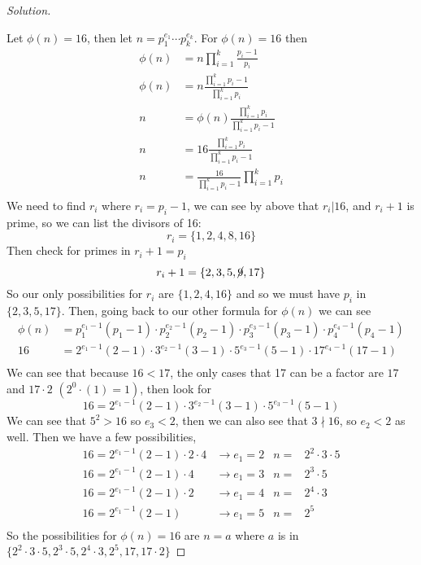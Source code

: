 \documentclass[11pt]{article}
\newcommand{\ndiv}{\nmid}
\newenvironment{solution}
  {\renewcommand\qedsymbol{$~$}\begin{proof}[Solution]$ $\par\nobreak\ignorespaces}
  {\end{proof}}
\begin{document}
\begin{solution}
    Let $\phi(n)=16$, then let $n=p_1^{e_1}\cdots p_k^{e_k}$. For $\phi(n)=16$ then
    \begin{align*}
        \phi(n) & = n \prod^{k}_{i=1} \frac{p_i-1}{p_i}                       \\
        \phi(n) & = n  \frac{\prod^{k}_{i=1} p_i-1}{\prod^{k}_{i=1} p_i}      \\
        n       & = \phi(n) \frac{\prod^{k}_{i=1} p_i}{\prod^{k}_{i=1} p_i-1} \\
        n       & = 16 \frac{\prod^{k}_{i=1} p_i}{\prod^{k}_{i=1} p_i-1}      \\
        n       & = \frac{16}{\prod^{k}_{i=1} p_i-1}  \prod^{k}_{i=1} p_i     \\
    \end{align*}
    We need to find $r_i$ where $r_i=p_i-1$, we can see by above that $r_i|16$, and $r_i+1$ is prime, so we can list the divisors of 16:
    \[
        r_i = \{1, 2, 4, 8, 16\}
    \]
    Then check for primes in $r_i+1=p_i$
    \[
        r_i +1  = \{2, 3, 5, \cancel{9}, 17\}
    \]
    So our only possibilities for $r_i$ are $\{1,2,4,16\}$ and so we must have $p_i$ in $\{2,3,5,17\}$. Then, going back to our other formula for $\phi(n)$ we can see
    \begin{align*}
        \phi(n) & = p_1^{e_1-1} (p_1-1) \cdot p_2^{e_2-1} (p_2-1) \cdot p_3^{e_3-1} (p_3-1) \cdot p_4^{e_4-1} (p_4-1) \\
        16      & = 2^{e_1-1} (2-1) \cdot 3^{e_2-1} (3-1) \cdot 5^{e_3-1} (5-1) \cdot 17^{e_4-1} (17-1)               \\
    \end{align*}
    We can see that because $16<17$, the only cases that 17 can be a factor are $17$ and $17\cdot 2$ $(2^0\cdot (1)=1)$, then look for
    \[
        16       = 2^{e_1-1} (2-1) \cdot 3^{e_2-1} (3-1) \cdot 5^{e_3-1} (5-1)
    \]
    We can see that $5^2>16$ so $e_3<2$, then we can also see that $3\ndiv 16$, so $e_2<2$ as well. Then we have a few possibilities,
    \[
        \begin{array}{ll|rl}
            16 = 2^{e_1-1} (2-1) \cdot 2 \cdot 4 & \rightarrow e_1 = 2 & n= & 2^2 \cdot 3 \cdot 5 \\
            16 = 2^{e_1-1} (2-1) \cdot 4         & \rightarrow e_1 = 3 & n= & 2^3 \cdot 5         \\
            16 = 2^{e_1-1} (2-1) \cdot 2         & \rightarrow e_1 = 4 & n= & 2^4 \cdot 3         \\
            16 = 2^{e_1-1} (2-1)                 & \rightarrow e_1 = 5 & n= & 2^5                 \\
        \end{array}
    \]
    So the possibilities for $\phi(n)=16$ are $n=a$ where $a$ is in $\{2^2\cdot 3\cdot 5, 2^3\cdot 5, 2^4\cdot 3, 2^5, 17, 17 \cdot 2\}$
\end{solution}
\end{document}
